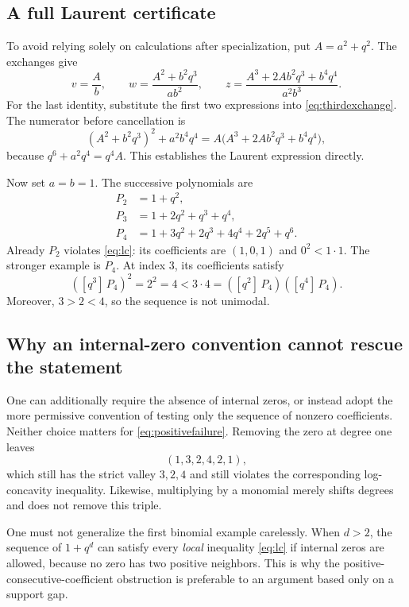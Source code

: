 \documentclass[11pt,letterpaper]{article}
\numberwithin{equation}{section}
\theoremstyle{definition}
\newcommand{\coeff}[2]{[q^{#1}]\,#2}
\begin{document}
\subsection{A full Laurent certificate}

To avoid relying solely on calculations after specialization, put
$A=a^2+q^2$. The exchanges give
\begin{equation}\label{eq:laurentcertificate}
 v=\frac{A}{b},\qquad
 w=\frac{A^2+b^2q^3}{ab^2},\qquad
 z=\frac{A^3+2Ab^2q^3+b^4q^4}{a^2b^3}.
\end{equation}
For the last identity, substitute the first two expressions into
\eqref{eq:thirdexchange}. The numerator before cancellation is
\[
 (A^2+b^2q^3)^2+a^2b^4q^4
 =A\bigl(A^3+2Ab^2q^3+b^4q^4\bigr),
\]
because $q^6+a^2q^4=q^4A$. This establishes the Laurent expression directly.

Now set $a=b=1$. The successive polynomials are
\begin{align}
 P_2&=1+q^2,\label{eq:P2}\\
 P_3&=1+2q^2+q^3+q^4,\label{eq:P3}\\
 P_4&=1+3q^2+2q^3+4q^4+2q^5+q^6.\label{eq:P4again}
\end{align}
Already $P_2$ violates \eqref{eq:lc}: its coefficients are $(1,0,1)$ and
$0^2<1\cdot1$. The stronger example is $P_4$. At index $3$, its coefficients
satisfy
\begin{equation}\label{eq:positivefailure}
 (\coeff{3}{P_4})^2=2^2=4
 <3\cdot4=(\coeff{2}{P_4})(\coeff{4}{P_4}).
\end{equation}
Moreover, $3>2<4$, so the sequence is not unimodal.

\subsection{Why an internal-zero convention cannot rescue the statement}

One can additionally require the absence of internal zeros, or instead adopt
the more permissive convention of testing only the sequence of nonzero
coefficients. Neither choice matters for \eqref{eq:positivefailure}. Removing the zero at degree one
leaves
\[
 (1,3,2,4,2,1),
\]
which still has the strict valley $3,2,4$ and still violates the corresponding
log-concavity inequality. Likewise, multiplying by a monomial merely shifts
degrees and does not remove this triple.

One must not generalize the first binomial example carelessly. When $d>2$,
the sequence of $1+q^d$ can satisfy every \emph{local} inequality
\eqref{eq:lc} if internal zeros are allowed, because no zero has two positive
neighbors. This is why the positive-consecutive-coefficient obstruction is
preferable to an argument based only on a support gap.
\end{document}
